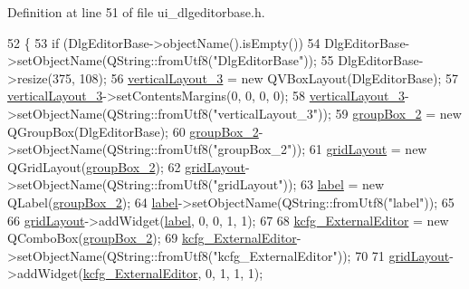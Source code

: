Definition at line 51 of file ui\+\_\+dlgeditorbase.\+h.


\begin{DoxyCode}
52     \{
53         \textcolor{keywordflow}{if} (DlgEditorBase->objectName().isEmpty())
54             DlgEditorBase->setObjectName(QString::fromUtf8(\textcolor{stringliteral}{"DlgEditorBase"}));
55         DlgEditorBase->resize(375, 108);
56         \hyperlink{classUi__DlgEditorBase_aead893366975b549c973d84baabe2582}{verticalLayout\_3} = \textcolor{keyword}{new} QVBoxLayout(DlgEditorBase);
57         \hyperlink{classUi__DlgEditorBase_aead893366975b549c973d84baabe2582}{verticalLayout\_3}->setContentsMargins(0, 0, 0, 0);
58         \hyperlink{classUi__DlgEditorBase_aead893366975b549c973d84baabe2582}{verticalLayout\_3}->setObjectName(QString::fromUtf8(\textcolor{stringliteral}{"verticalLayout\_3"}));
59         \hyperlink{classUi__DlgEditorBase_ac29bd679e8fa10b5cc21c9db0015ef32}{groupBox\_2} = \textcolor{keyword}{new} QGroupBox(DlgEditorBase);
60         \hyperlink{classUi__DlgEditorBase_ac29bd679e8fa10b5cc21c9db0015ef32}{groupBox\_2}->setObjectName(QString::fromUtf8(\textcolor{stringliteral}{"groupBox\_2"}));
61         \hyperlink{classUi__DlgEditorBase_a00e2ad664672aefcb22d0f5db12ead6e}{gridLayout} = \textcolor{keyword}{new} QGridLayout(\hyperlink{classUi__DlgEditorBase_ac29bd679e8fa10b5cc21c9db0015ef32}{groupBox\_2});
62         \hyperlink{classUi__DlgEditorBase_a00e2ad664672aefcb22d0f5db12ead6e}{gridLayout}->setObjectName(QString::fromUtf8(\textcolor{stringliteral}{"gridLayout"}));
63         \hyperlink{classUi__DlgEditorBase_a678b5c63f8a18e14b1c4ddb8cc24ff73}{label} = \textcolor{keyword}{new} QLabel(\hyperlink{classUi__DlgEditorBase_ac29bd679e8fa10b5cc21c9db0015ef32}{groupBox\_2});
64         \hyperlink{classUi__DlgEditorBase_a678b5c63f8a18e14b1c4ddb8cc24ff73}{label}->setObjectName(QString::fromUtf8(\textcolor{stringliteral}{"label"}));
65 
66         \hyperlink{classUi__DlgEditorBase_a00e2ad664672aefcb22d0f5db12ead6e}{gridLayout}->addWidget(\hyperlink{classUi__DlgEditorBase_a678b5c63f8a18e14b1c4ddb8cc24ff73}{label}, 0, 0, 1, 1);
67 
68         \hyperlink{classUi__DlgEditorBase_aea3d3090a97b8e3074b1e571713a9510}{kcfg\_ExternalEditor} = \textcolor{keyword}{new} QComboBox(\hyperlink{classUi__DlgEditorBase_ac29bd679e8fa10b5cc21c9db0015ef32}{groupBox\_2});
69         \hyperlink{classUi__DlgEditorBase_aea3d3090a97b8e3074b1e571713a9510}{kcfg\_ExternalEditor}->setObjectName(QString::fromUtf8(\textcolor{stringliteral}{"kcfg\_ExternalEditor"}));
70 
71         \hyperlink{classUi__DlgEditorBase_a00e2ad664672aefcb22d0f5db12ead6e}{gridLayout}->addWidget(\hyperlink{classUi__DlgEditorBase_aea3d3090a97b8e3074b1e571713a9510}{kcfg\_ExternalEditor}, 0, 1, 1, 1);

\end{DoxyCode}
